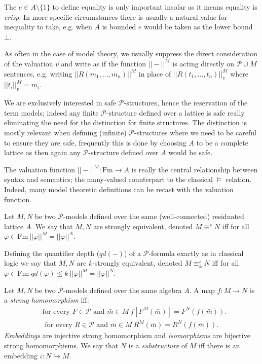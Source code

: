 \documentclass{lmcs} %
\newcommand{\?}{\ensuremath{\mkern0.4\thinmuskip}}
\let\phi=\varphi
\newcommand{\CP}{\mathcal{P}}
\begin{document}
\begin{rem}
    The $e\in A\setminus\{1\}$ to define equality is only important insofar as it means equality is \textit{crisp}. In more specific circumstances there is usually a natural value for inequality to take, e.g. when $A$ is bounded $e$ would be taken as the lower bound $\bot$. 
    
    As often in the case of model theory, we usually suppress the direct consideration of the valuation $v$ and write as if the function $||-||^M$ is acting directly on $\CP\cup M$ sentences, e.g. writing $||R(m_1,...,m_n)||^M$ in place of $||R(t_1,...,t_n)||^M_v$ where $||t_i||^M_v=m_i$. 

    We are exclusively interested in safe $\CP$-structures, hence the reservation of the term models; indeed any finite $\CP$-structure defined over a lattice is safe really eliminating the need for the distinction for finite structures. The distinction is mostly relevant when defining (infinite) $\CP$-structures where we need to be careful to ensure they are safe, frequently this is done by choosing $A$ to be a complete lattice as then again any $\CP$-structure defined over $A$ would be safe.
\end{rem}

The valuation function $||-||^M\colon \mathrm{Fm}\rightarrow A$ is really the central relationship between syntax and semantics; the many-valued counterpart to the classical $\models$ relation. Indeed, many model theoretic definitions can be recast with the valuation function.
\begin{defi}
    Let $M,N$ be two $\CP$-models defined over the same (well-connected) residuated lattice $A$. We say that $M,N$ are strongly equivalent, denoted $M\equiv^s N$ iff for all $\phi\in \mathrm{Fm}\ ||\phi||^M=||\phi||^N$.  

    Defining the quantifier depth ($qd(-)$) of a $\CP$-formula exactly as in classical logic we say that $M,N$ are $k$-strongly equivalent, denoted $M\equiv^s_k N$ iff for all $\phi\in \mathrm{Fm}:qd(\phi)\leq k\ ||\phi||^M=||\phi||^N$. 
\end{defi}

\begin{defi}
    Let $M,N$ be two $\CP$-models defined over the same algebra $A$. A map $f\colon M\rightarrow N$ is a \textit{strong homomorphism} iff:\begin{align*}
        &\text{for every }F\in\CP\text{ and }\bar{m}\in M\ f[F^M(\bar{m})]=F^N(f(\bar{m})).\\
        &\text{ for every }R\in\CP\text{ and }\bar{m}\in M\ R^M(\bar{m})= R^N(f(\bar{m})).
    \end{align*}
    \textit{Embeddings} are injective strong homomorphism and \textit{isomorphisms} are bijective strong homomorphisms. We say that $N$ is a \textit{substructure} of $M$ iff there is an embedding $\iota\colon N\hookrightarrow M$. 
\end{defi}
\end{document}
